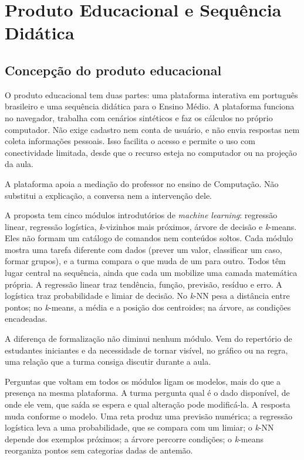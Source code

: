\chapter{Produto Educacional e Sequência Didática}

\section{Concepção do produto educacional}

O produto educacional tem duas partes: uma plataforma interativa em português brasileiro e uma sequência didática para o Ensino Médio. A plataforma funciona no navegador, trabalha com cenários sintéticos e faz os cálculos no próprio computador. Não exige cadastro nem conta de usuário, e não envia respostas nem coleta informações pessoais. Isso facilita o acesso e permite o uso com conectividade limitada, desde que o recurso esteja no computador ou na projeção da aula.

A plataforma apoia a mediação do professor no ensino de Computação. Não substitui a explicação, a conversa nem a intervenção dele.

A proposta tem cinco módulos introdutórios de \textit{machine learning}: regressão linear, regressão logística, \textit{k}-vizinhos mais próximos, árvore de decisão e \textit{k}-means. Eles não formam um catálogo de comandos nem conteúdos soltos. Cada módulo mostra uma tarefa diferente com dados (prever um valor, classificar um caso, formar grupos), e a turma compara o que muda de um para outro. Todos têm lugar central na sequência, ainda que cada um mobilize uma camada matemática própria. A regressão linear traz tendência, função, previsão, resíduo e erro. A logística traz probabilidade e limiar de decisão. No \textit{k}-NN pesa a distância entre pontos; no \textit{k}-means, a média e a posição dos centroides; na árvore, as condições encadeadas.

A diferença de formalização não diminui nenhum módulo. Vem do repertório de estudantes iniciantes e da necessidade de tornar visível, no gráfico ou na regra, uma relação que a turma consiga discutir durante a aula.

Perguntas que voltam em todos os módulos ligam os modelos, mais do que a presença na mesma plataforma. A turma pergunta qual é o dado disponível, de onde ele vem, que saída se espera e qual alteração pode modificá-la. A resposta muda conforme o modelo. Uma reta produz uma previsão numérica; a regressão logística leva a uma probabilidade, que se compara com um limiar; o \textit{k}-NN depende dos exemplos próximos; a árvore percorre condições; o \textit{k}-means reorganiza pontos sem categorias dadas de antemão.

